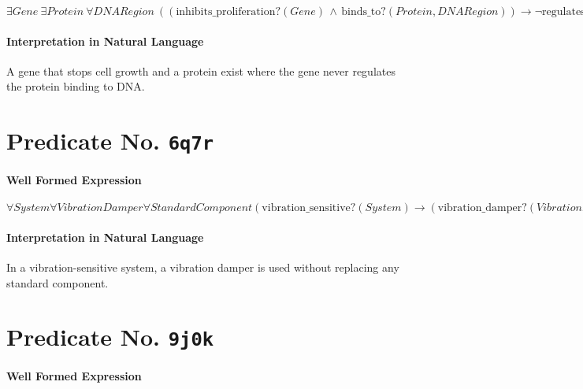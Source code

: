 \documentclass[11pt]{article}
\begin{document}
\(\exists \mathit{Gene}\ \exists \mathit{Protein}\ \forall \mathit{DNARegion}\ ((\mathrm{inhibits\_proliferation?}(\mathit{Gene}) \,\land\, \mathrm{binds\_to?}(\mathit{Protein}, \mathit{DNARegion})) \rightarrow \neg \mathrm{regulates\_binding?}(\mathit{Gene}, \mathit{Protein}, \mathit{DNARegion}))\)

\paragraph*{Interpretation in Natural Language}
\label{sec:org724b532}

A gene that stops cell growth and a protein exist where the gene never regulates the protein binding to DNA.



\section{Predicate No. \texttt{6q7r}}
\label{sec:orge2e1314}

\paragraph*{Well Formed Expression}
\label{sec:org9acce60}

\(\forall \mathit{System} \forall \mathit{VibrationDamper} \forall \mathit{StandardComponent} (\mathrm{vibration\_sensitive?}(\mathit{System}) \rightarrow (\mathrm{vibration\_damper?}(\mathit{VibrationDamper}) \land \neg \mathrm{replaced\_by?}(\mathit{StandardComponent}, \mathit{VibrationDamper})))\)

\paragraph*{Interpretation in Natural Language}
\label{sec:org12775ea}

In a vibration-sensitive system, a vibration damper is used without replacing any standard component.



\section{Predicate No. \texttt{9j0k}}
\label{sec:orgfaaad17}

\paragraph*{Well Formed Expression}
\label{sec:org12b0e73}
\end{document}
